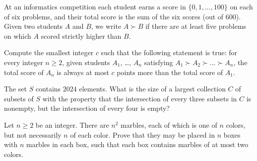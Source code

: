 \begin{problem}
At an informatics competition each student earns a score in $\{0, 1, \dots, 100\}$
on each of six problems, and their total score is the sum of the six scores (out of $600$).
Given two students $A$ and $B$, we write $A \succ B$
if there are at least five problems on which $A$ scored strictly higher than $B$.

Compute the smallest integer $c$ such that the following statement is true:
for every integer $n \ge 2$,
given students $A_1$, \dots, $A_n$ satisfying $A_1 \succ A_2 \succ \dots \succ A_n$,
the total score of $A_n$ is always at most $c$ points more than the total score of $A_1$.
\end{problem} 



\begin{problem}
The set $S$ contains $2024$ elements.
What is the size of a largest collection $C$ of subsets of $S$
with the property that the intersection of every three subsets in $C$ is nonempty,
but the intersection of every four is empty?
\end{problem} 




\begin{problem}
Let $n \ge 2$ be an integer.
There are $n^2$ marbles, each of which is one of $n$ colors,
but not necessarily $n$ of each color.
Prove that they may be placed in $n$ boxes
with $n$ marbles in each box,
such that each box contains marbles of at most two colors.
\end{problem} 


